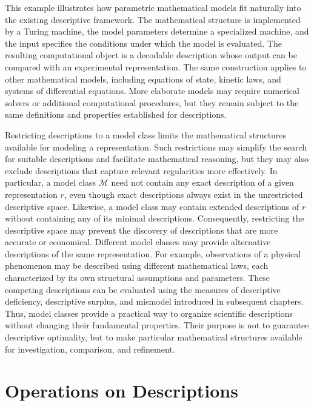 This example illustrates how parametric mathematical models fit naturally into the existing descriptive framework. The mathematical structure is implemented by a Turing machine, the model parameters determine a specialized machine, and the input specifies the conditions under which the model is evaluated. The resulting computational object is a decodable description whose output can be compared with an experimental representation. The same construction applies to other mathematical models, including equations of state, kinetic laws, and systems of differential equations. More elaborate models may require numerical solvers or additional computational procedures, but they remain subject to the same definitions and properties established for descriptions.

Restricting descriptions to a model class limits the mathematical structures available for modeling a representation. Such restrictions may simplify the search for suitable descriptions and facilitate mathematical reasoning, but they may also exclude descriptions that capture relevant regularities more effectively. In particular, a model class $\mathcal{M}$ need not contain any exact description of a given representation $r$, even though exact descriptions always exist in the unrestricted descriptive space. Likewise, a model class may contain extended descriptions of $r$ without containing any of its minimal descriptions. Consequently, restricting the descriptive space may prevent the discovery of descriptions that are more accurate or economical. Different model classes may provide alternative descriptions of the same representation. For example, observations of a physical phenomenon may be described using different mathematical laws, each characterized by its own structural assumptions and parameters. These competing descriptions can be evaluated using the measures of descriptive deficiency, descriptive surplus, and mismodel introduced in subsequent chapters. Thus, model classes provide a practical way to organize scientific descriptions without changing their fundamental properties. Their purpose is not to guarantee descriptive optimality, but to make particular mathematical structures available for investigation, comparison, and refinement.

%
%

\section{Operations on Descriptions}

